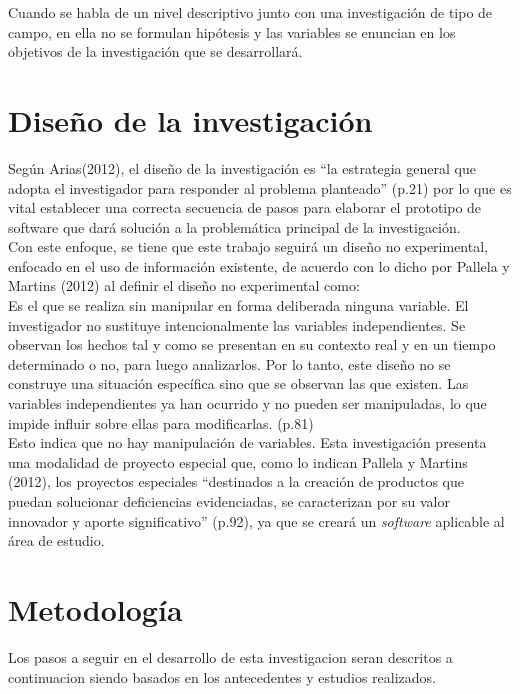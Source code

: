 	Cuando se habla de un nivel descriptivo junto con una investigaci\'on de tipo de campo, en ella no se formulan hip\'otesis y las variables se enuncian en los objetivos de la investigaci\'on que se desarrollar\'a.
	
\section{Dise\~no de la investigaci\'on}
	
Seg\'un Arias(2012), el dise\~no de la investigaci\'on es “la estrategia general que adopta el investigador para responder al problema planteado” (p.21) por lo que es vital establecer una correcta secuencia de pasos para elaborar el prototipo de software que dar\'a soluci\'on a la problem\'atica principal de la investigaci\'on.\\

Con este enfoque, se tiene que este trabajo seguir\'a un dise\~no no experimental, enfocado en el uso de informaci\'on existente, de acuerdo con lo dicho por Pallela y  Martins (2012) al definir el dise\~no no experimental como:\\

Es el que se realiza sin manipular en forma deliberada ninguna variable. El investigador no sustituye intencionalmente las variables independientes. Se observan los hechos tal y como se presentan en su contexto real y en un tiempo determinado o no, para luego analizarlos. Por lo tanto, este dise\~no no se construye una situaci\'on espec\'ifica sino que se observan las que existen. Las variables independientes ya han ocurrido y no pueden ser manipuladas, lo que impide influir sobre ellas para modificarlas. (p.81)\\

Esto indica que no hay manipulaci\'on de variables. Esta investigaci\'on presenta una modalidad de proyecto especial que, como lo indican Pallela y  Martins (2012), los proyectos especiales “destinados a la creaci\'on de productos que puedan solucionar deficiencias evidenciadas, se caracterizan por su valor innovador y aporte significativo” (p.92), ya que se crear\'a un \emph{software} aplicable al \'area de estudio.\\

\section{Metodolog\'ia}

Los pasos a seguir en el desarrollo de esta investigacion seran descritos a continuacion siendo basados en los antecedentes y estudios realizados.\\

